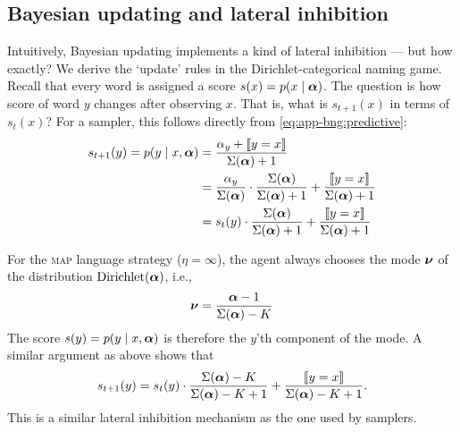 \documentclass{../src/bcthesispart}
\begin{document}
\subsection{Bayesian updating and lateral inhibition}


Intuitively, Bayesian updating implements a kind of lateral inhibition — but how exactly?
We derive the ‘update’ rules in the Dirichlet-categorical naming game.
Recall that every word is assigned a score $s(x) = p(x \mid \boldsymbol{\mathbf{\alpha}})$.
The question is how score of word $y$ changes after observing $x$.
That is, what is $s_{t+1}(x)$ in terms of $s_t(x)$?
For a sampler, this follows directly from \eqref{eq:app-bng:predictive}:
\begin{align}
	\label{eq:app-bng:update-sampler}
	s_{t+1}(y) 
		= p(y \mid x, \vect\alpha)
		&= \frac{\alpha_y + \ind{y = x}}%
			{\vectsum{\vect\alpha} + 1}
		\\
		&= \frac{\alpha_y}{\vectsum{\vect\alpha}} 
			\cdot \frac{\vectsum{\vect\alpha}}%
				{\vectsum{\vect\alpha} + 1} 
			+ \frac{\ind{y = x}}%
				{\vectsum{\vect\alpha} + 1}
		\\
		&= s_t(y)
			\cdot \frac{\vectsum{\vect\alpha}}%
				{\vectsum{\vect\alpha} + 1} 
			+ \frac{\ind{y = x}}%
				{\vectsum{\vect\alpha} + 1}
\end{align}




For the \textsc{map} language strategy ($\eta=\infty$), the agent always chooses the mode $\boldsymbol{\mathbf{\nu}}$ of the distribution $\text{Dirichlet}(\boldsymbol{\mathbf{\alpha}})$, i.e.,
\begin{equation}
	\vect\nu 
		= \frac{\vect\alpha - 1}%
			{\vectsum{\vect\alpha} - K}
\end{equation}
The score $s(y) = p(y \mid x, \boldsymbol{\mathbf{\alpha}})$ is therefore the $y$’th component of the mode. 
A similar argument as above shows that
\begin{align}
	\label{eq:app-bng:update-MAP}
	s_{t+1}(y) 
		= s_t(y)
	 		\cdot \frac{\vectsum{\vect\alpha} - K}%
	 			{\vectsum{\vect\alpha} - K + 1}
			+ \frac{\ind{y=x}}%
				{\vectsum{\vect\alpha} - K + 1}.
\end{align}
This is a similar lateral inhibition mechanism as the one used by samplers.



\showbibliography
\end{document}
